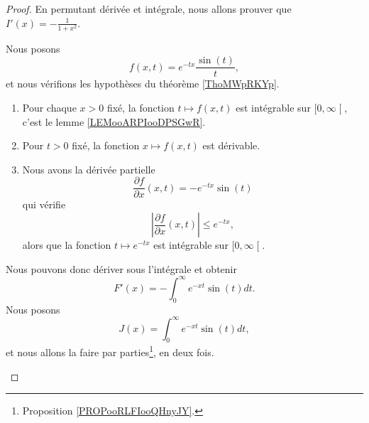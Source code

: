 \begin{proof}
	En permutant dérivée et intégrale, nous allons prouver que \( I'(x)=-\frac{1}{ 1+x^2 }\).

	\begin{subproof}
		\spitem[Permuter]
		Nous posons
		\begin{equation}
			f(x,t)= e^{-tx}\frac{ \sin(t) }{ t },
		\end{equation}
		et nous vérifions les hypothèses du théorème \ref{ThoMWpRKYp}.

		\begin{enumerate}
			\item
			      Pour chaque \( x>0\) fixé, la fonction \( t\mapsto f(x,t)\) est intégrable sur \( \mathopen[ 0 , \infty \mathclose[\), c'est le lemme \ref{LEMooARPIooDPSGwR}.
			\item
			      Pour \( t>0\) fixé, la fonction \( x\mapsto f(x,t)\) est dérivable.
			\item
			      Nous avons la dérivée partielle
			      \begin{equation}
				      \frac{ \partial f }{ \partial x }(x,t)=- e^{-tx}\sin(t)
			      \end{equation}
			      qui vérifie
			      \begin{equation}
				      | \frac{ \partial f }{ \partial x }(x,t) |\leq  e^{-tx},
			      \end{equation}
			      alors que la fonction \( t\mapsto  e^{-tx}\) est intégrable sur \( \mathopen[ 0 , \infty \mathclose[\).
		\end{enumerate}
		Nous pouvons donc dériver sous l'intégrale et obtenir
		\begin{equation}
			F'(x)=-\int_0^{\infty} e^{-xt}\sin(t)dt.
		\end{equation}
		Nous posons
		\begin{equation}
			J(x)=\int_0^{\infty} e^{-xt}\sin(t)dt,
		\end{equation}
		et nous allons la faire par parties\footnote{Proposition \ref{PROPooRLFIooQHnyJY}.}, en deux fois.


\end{subproof}
\end{proof}
